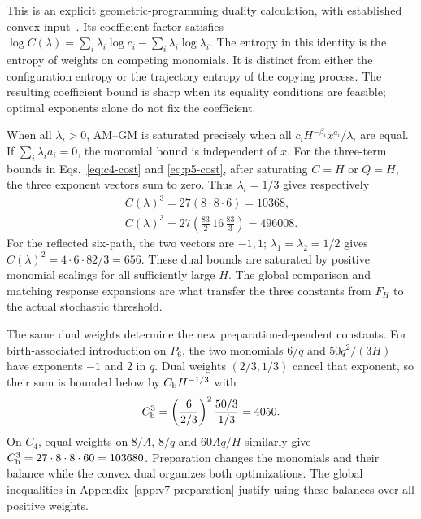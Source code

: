 \documentclass[aps,pre,reprint,amsmath,amssymb,longbibliography]{revtex4-2}
\begin{document}
This is an explicit geometric-programming duality calculation, with
established convex input~\cite{MathBoydGP2007}. Its coefficient factor satisfies
$\log C(\lambda)=\sum_i\lambda_i\log c_i-\sum_i\lambda_i\log\lambda_i$.
The entropy in this identity is the entropy of weights on competing
monomials. It is distinct from either the configuration entropy or the
trajectory entropy of the copying process. The resulting coefficient bound is sharp when its equality conditions
are feasible; optimal exponents alone do not fix the coefficient.

When all $\lambda_i>0$, AM--GM is saturated precisely when all
$c_iH^{-\beta_i}x^{a_i}/\lambda_i$ are equal. If
$\sum_i\lambda_i a_i=0$, the monomial bound is independent of $x$.
For the three-term bounds in Eqs.~\eqref{eq:c4-cost} and \eqref{eq:p5-cost}, after
saturating $C=H$ or $Q=H$, the three exponent vectors sum to zero.
Thus $\lambda_i=1/3$ gives respectively
\begin{equation}
 \begin{gathered}
 C(\lambda)^3=27(8\cdot8\cdot6)=10368,
 \\
 C(\lambda)^3=27\left(\frac{83}{2}\,16\,\frac{83}{3}\right)=496008.
 \end{gathered}
\end{equation}
For the reflected six-path, the two vectors are $-1,1$;
$\lambda_1=\lambda_2=1/2$ gives
$C(\lambda)^2=4\cdot6\cdot82/3=656$.
These dual bounds are saturated by positive monomial scalings for all
sufficiently large $H$. The global comparison and matching
response expansions are what transfer the three constants from $F_H$
to the actual stochastic threshold.


The same dual weights determine the new preparation-dependent constants.
For birth-associated introduction on $P_6$, the two monomials
$6/q$ and $50q^2/(3H)$ have exponents $-1$ and $2$ in $q$.
Dual weights $(2/3,1/3)$ cancel that exponent, so their sum is bounded
below by $C_{\rm b}H^{-1/3}$ with
\begin{equation}
 C_{\rm b}^3=\left(\frac{6}{2/3}\right)^2
                  \frac{50/3}{1/3}=4050.
 \label{eq:v7-birth-dual-p6}
\end{equation}
On $C_4$, equal weights on $8/A$, $8/q$ and $60Aq/H$ similarly
give $C_{\rm b}^3=27\cdot8\cdot8\cdot60=103680$.
Preparation changes the monomials and their balance while the convex
dual organizes both optimizations. The global inequalities in
Appendix~\ref{app:v7-preparation} justify using these balances over
all positive weights.
\end{document}
